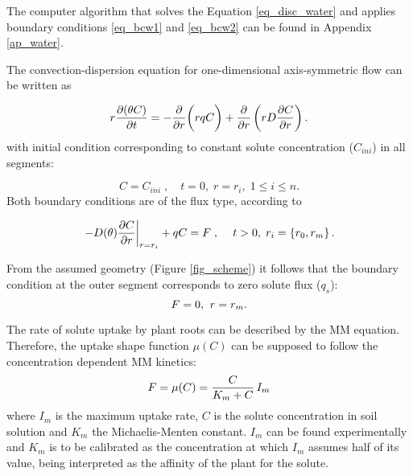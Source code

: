 The computer algorithm that solves the Equation \ref{eq_disc_water} and applies boundary conditions \ref{eq_bcw1} and \ref{eq_bcw2} can be found in Appendix \ref{ap_water}.

The convection-dispersion equation for one-dimensional axis-symmetric flow can be written as

\begin{equation}
\label{eq_complete_solute}
r {\partial(\theta C) \over \partial t} = -{\partial \over \partial r} \biggl(r q C \biggr) + {\partial  \over \partial r} \left( r D {\partial C \over \partial r} \right).
\end{equation}
%
with initial condition corresponding to constant solute concentration ($C_{ini}$) in all segments:

\begin{equation}
C = C_{ini}\;, \quad t=0,\; r=r_i,\; 1 \leq i \leq n.
\end{equation}
%
Both boundary conditions are of the flux type, according to 

\begin{equation}
  \label{eq_boundary_sol}
  \left. -D(\theta) {\partial C \over \partial r} \right|_{r=r_i} + qC = F\;{\rm ,} \;\;\;\;\; t>0,\; r_i=\{r_0,r_m\}\,.
\end{equation}


From the assumed geometry (Figure \ref{fig_scheme}) it follows that the boundary condition at the outer segment corresponds to zero solute flux ($q_s$):
\begin{equation}
  \label{eq_bcrm}
  F = 0 {\rm ,} \;\; r=r_m.
\end{equation}

The rate of solute uptake by plant roots can be described by the MM equation. 
Therefore, the uptake shape function $\mu(C)$ can be supposed to follow the concentration dependent MM kinetics:
\begin{equation}
  \label{eq_MM1}
F = \mu(C) = {C \over K_m+C}\, I_m
\end{equation}
%
where $I_m$ is the maximum uptake rate, $C$ is the solute concentration in soil solution and $K_m$ the Michaelis-Menten constant. 
$I_m$ can be found experimentally and $K_m$ is to be calibrated as the concentration at which $I_m$ assumes half of its value, being interpreted as the affinity of the plant for the solute. 


